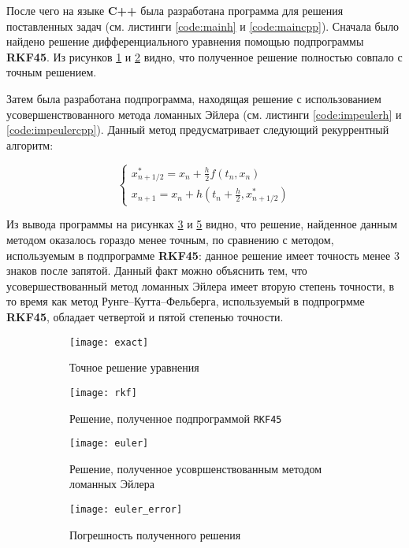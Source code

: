 \vspace{0.25cm}

После чего на языке \textbf{C++} была разработана программа для решения поставленных задач (см. листинги \ref{code:mainh} и \ref{code:maincpp}). Сначала было найдено решение дифференциального уравнения помощью подпрограммы \textbf{RKF45}. Из рисунков \ref{fig:exact} и \ref{fig:rkf} видно, что полученное решение полностью совпало с точным решением.

Затем была разработана подпрограмма, находящая решение с использованием усовершенствованного метода ломанных Эйлера (см. листинги \ref{code:impeulerh} и \ref{code:impeulercpp}). Данный метод предусматривает следующий рекуррентный алгоритм: 

\[
\begin{cases}
	x_{n+1/2}^{*} = x_n + \frac{h}{2} f(t_n, x_n)
	\\
	x_{n+1} = x_n + h \left(t_n + \frac{h}{2}, x_{n+1/2}^{*} \right)
\end{cases}
\]

Из вывода программы на рисунках \ref{fig:euler} и \ref{fig:euler_error} видно, что решение, найденное данным методом оказалось гораздо менее точным, по сравнению с методом, используемым в подпрограмме \textbf{RKF45}: данное решение имеет точность менее 3 знаков после запятой. Данный факт можно объяснить тем, что усовершествованный метод ломанных Эйлера имеет вторую степень точности, в то время как метод Рунге--Кутта--Фельберга, используемый в подпрогрмме \textbf{RKF45}, обладает четвертой и пятой степенью точности.

\begin{figure}[H]
\begin{center}
	\begin{subfigure}[t]{0.35\textwidth}
		\texttt{[image: exact]}
		\caption{Точное решение уравнения}
		\label{fig:exact}
	\end{subfigure}
	\begin{subfigure}[t]{0.35\textwidth}
		\texttt{[image: rkf]}
		\caption{Решение, полученное подпрограммой \texttt{RKF45}}
		\label{fig:rkf}
	\end{subfigure}
	\begin{subfigure}[t]{0.35\textwidth}
		\texttt{[image: euler]}
		\caption{Решение, полученное усовршенствованным методом ломанных Эйлера}
		\label{fig:euler}
	\end{subfigure}
	\begin{subfigure}[t]{0.35\textwidth}
		\texttt{[image: euler\_error]}
		\caption{Погрешность полученного решения}
		\label{fig:euler_error}
	\end{subfigure}
	\caption{}
	\vspace{-0.8cm}
\end{center}
\end{figure}

